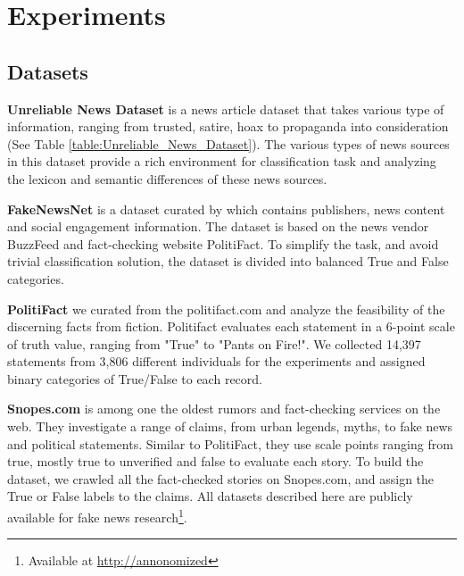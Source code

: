 \section{Experiments}

\subsection{Datasets}
\textbf{Unreliable News Dataset} \cite{Rashkin2017TruthOV} is a news article dataset that takes various type of information, ranging from trusted, satire, hoax to propaganda into consideration (See Table \ref{table:Unreliable_News_Dataset}). The various types of news sources in this dataset provide a rich environment for classification task and analyzing the lexicon and semantic differences of these news sources.   

\textbf{FakeNewsNet} is a dataset curated by \citet{shu2018} which contains publishers, news content and social engagement information. The dataset is based on the news vendor BuzzFeed and fact-checking website PolitiFact. To simplify the task, and avoid trivial classification solution, the dataset is divided into balanced True and False categories.   

\textbf{PolitiFact} we curated from the politifact.com and analyze the feasibility of the discerning facts from fiction. Politifact evaluates each statement in a 6-point scale of truth value, ranging from "True" to "Pants on Fire!". We collected 14,397 statements from 3,806 different individuals for the experiments and assigned binary categories of True/False to each record. 

\textbf{Snopes.com} is among one the oldest rumors and fact-checking services on the web. They investigate a range of claims, from urban legends, myths, to fake news and political statements. Similar to PolitiFact, they use scale points ranging from true, mostly true to unverified and false to evaluate each story. To build the dataset, we crawled all the fact-checked stories on Snopes.com, and assign the True or False labels to the claims. All datasets described here are publicly available for fake news research\footnote{Available at \url{http://annonomized}}. 
 
